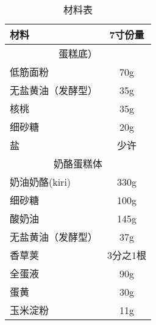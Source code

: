 \begin{table}[h]
    \centering
    \begin{tabular}{|l||c|}\hline
     \textbf{材料}    &  \textbf{7寸份量}\\ \hline\hline
    \multicolumn{2}{|c|}{蛋糕底）}\\ \hline
    低筋面粉 & 70g \\ \hline
    无盐黄油（发酵型） & 35g \\ \hline
    核桃 & 35g \\ \hline
    细砂糖 & 20g \\ \hline
    盐 & 少许 \\ \hline
    \multicolumn{2}{|c|}{奶酪蛋糕体}\\ \hline
    奶油奶酪(kiri)     &  330g \\ \hline
    细砂糖     &  100g \\ \hline
    酸奶油 &  145g \\ \hline
    无盐黄油（发酵型） & 37g \\ \hline
    香草荚 & 3分之1根 \\ \hline
    全蛋液 & 90g \\ \hline
    蛋黄 & 30g \\ \hline
    玉米淀粉 & 11g \\ \hline
    \end{tabular}
    \caption{材料表}
\end{table}

